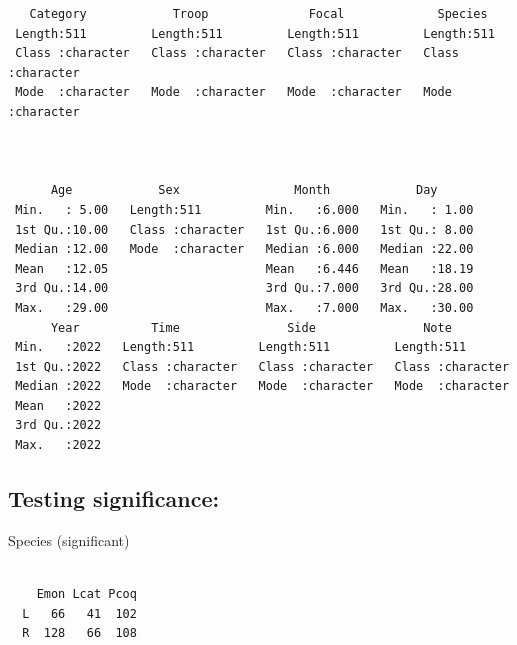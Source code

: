 \documentclass[
  letterpaper,
  DIV=11,
  numbers=noendperiod]{scrartcl}
\newenvironment{Shaded}{\begin{snugshade}}{\end{snugshade}}
\newcommand{\FunctionTok}[1]{\textcolor[rgb]{0.28,0.35,0.67}{#1}}
\newcommand{\NormalTok}[1]{\textcolor[rgb]{0.00,0.23,0.31}{#1}}
\newcommand{\SpecialCharTok}[1]{\textcolor[rgb]{0.37,0.37,0.37}{#1}}
\begin{document}
\begin{verbatim}
   Category            Troop              Focal             Species         
 Length:511         Length:511         Length:511         Length:511        
 Class :character   Class :character   Class :character   Class :character  
 Mode  :character   Mode  :character   Mode  :character   Mode  :character  
                                                                            
                                                                            
                                                                            
      Age            Sex                Month            Day       
 Min.   : 5.00   Length:511         Min.   :6.000   Min.   : 1.00  
 1st Qu.:10.00   Class :character   1st Qu.:6.000   1st Qu.: 8.00  
 Median :12.00   Mode  :character   Median :6.000   Median :22.00  
 Mean   :12.05                      Mean   :6.446   Mean   :18.19  
 3rd Qu.:14.00                      3rd Qu.:7.000   3rd Qu.:28.00  
 Max.   :29.00                      Max.   :7.000   Max.   :30.00  
      Year          Time               Side               Note          
 Min.   :2022   Length:511         Length:511         Length:511        
 1st Qu.:2022   Class :character   Class :character   Class :character  
 Median :2022   Mode  :character   Mode  :character   Mode  :character  
 Mean   :2022                                                           
 3rd Qu.:2022                                                           
 Max.   :2022                                                           
\end{verbatim}

\hypertarget{testing-significance}{%
\subsection{Testing significance:}\label{testing-significance}}

Species (significant)

\begin{Shaded}
\end{Shaded}

\begin{verbatim}
   
    Emon Lcat Pcoq
  L   66   41  102
  R  128   66  108
\end{verbatim}
\end{document}
